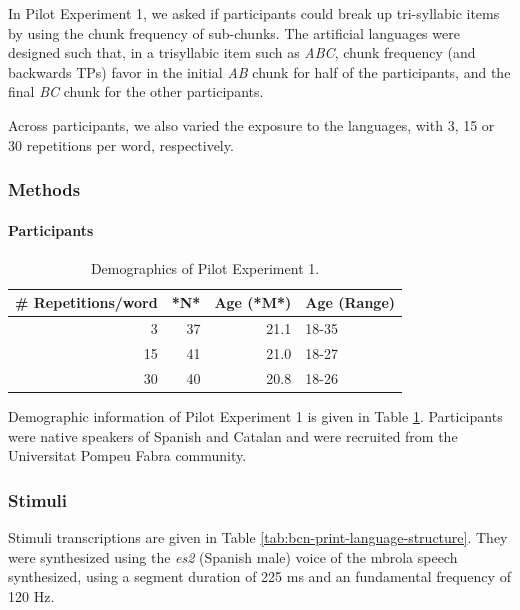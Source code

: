 \documentclass[
]{article}
\begin{document}
In Pilot Experiment 1, we asked if participants could break up
tri-syllabic items by using the chunk frequency of sub-chunks. The
artificial languages were designed such that, in a trisyllabic item such
as \emph{ABC}, chunk frequency (and backwards TPs) favor in the initial
\emph{AB} chunk for half of the participants, and the final \emph{BC}
chunk for the other participants.

Across participants, we also varied the exposure to the languages, with
3, 15 or 30 repetitions per word, respectively.

\hypertarget{methods}{%
\subsubsection{Methods}\label{methods}}

\hypertarget{participants-2}{%
\paragraph{Participants}\label{participants-2}}

\begin{table}

\caption{\label{tab:bcn-demographics}Demographics of Pilot Experiment 1.}
\centering
\begin{tabular}[t]{rrrl}
\toprule
\# Repetitions/word & *N* & Age (*M*) & Age (Range)\\
\midrule
3 & 37 & 21.1 & 18-35\\
15 & 41 & 21.0 & 18-27\\
30 & 40 & 20.8 & 18-26\\
\bottomrule
\end{tabular}
\end{table}

Demographic information of Pilot Experiment 1 is given in Table
\ref{tab:bcn-demographics}. Participants were native speakers of Spanish
and Catalan and were recruited from the Universitat Pompeu Fabra
community.

\hypertarget{stimuli-1}{%
\subsubsection{Stimuli}\label{stimuli-1}}

Stimuli transcriptions are given in Table
\ref{tab:bcn-print-language-structure}. They were synthesized using the
\emph{es2} (Spanish male) voice of the mbrola \citep{mbrola} speech
synthesized, using a segment duration of 225 ms and an fundamental
frequency of 120 Hz.
\end{document}
